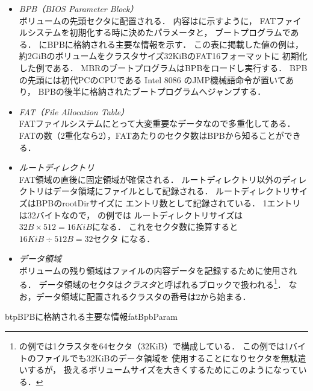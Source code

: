 \begin{itemize}
\item \emph{BPB（BIOS Parameter Block）}\\
  ボリュームの先頭セクタに配置される．
  内容はに示すように，
  FATファイルシステムを初期化する時に決めたパラメータと，
  ブートプログラムである．
  にBPBに格納される主要な情報を示す．
  この表に掲載した値の例は，
  約2GiBのボリュームをクラスタサイズ32KiBのFAT16フォーマットに
  初期化した例である．
  MBRのブートプログラムはBPBをロードし実行する．
  BPBの先頭には初代PCのCPUである Intel 8086 のJMP機械語命令が置いてあり，
  BPBの後半に格納されたブートプログラムへジャンプする．

\item \emph{FAT（File Allocation Table）}\\
  FATファイルシステムにとって大変重要なデータなので多重化してある．
  FATの数（2重化なら2），FATあたりのセクタ数はBPBから知ることができる．

\item \emph{ルートディレクトリ}\\
  FAT領域の直後に固定領域が確保される．
  ルートディレクトリ以外のディレクトリはデータ領域にファイルとして記録される．
  ルートディレクトリサイズはBPBのrootDirサイズに
  エントリ数として記録されている．
  1エントリは32バイトなので，
  の例では
  ルートディレクトリサイズは$32B \times 512 = 16KiB$になる．
  これをセクタ数に換算すると$16KiB \div 512B = 32セクタ$ になる．

\item \emph{データ領域}\\
  ボリュームの残り領域はファイルの内容データを記録するために使用される．
  データ領域のセクタは\emph{クラスタ}と呼ばれるブロックで扱われる\footnote{
    の例では1クラスタを64セクタ（32KiB）で構成している．
    この例では1バイトのファイルでも32KiBのデータ領域を
    使用することになりセクタを無駄遣いするが，
    扱えるボリュームサイズを大きくするためにこのようになっている．}．
  なお，データ領域に配置されるクラスタの番号は2から始まる．
\end{itemize}

\begin{mytable}{btp}{BPBに格納される主要な情報}{fatBpbParam}
\end{mytable}

